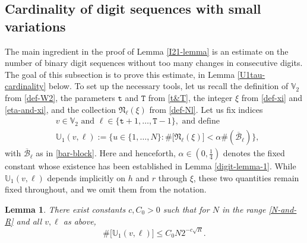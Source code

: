 \documentclass[12pt, twoside]{article}
\newtheorem{lemma}[theorem]{Lemma}
\theoremstyle{definition}
\numberwithin{equation}{section}
\begin{document}
\subsection{Cardinality of digit sequences with small variations}
The main ingredient in the proof of Lemma \ref{I21-lemma} is an estimate on the number of binary digit sequences without too many changes in consecutive digits. The goal of this subsection is to prove this estimate, in Lemma \ref{U1tau-cardinality} below. To set up the necessary tools, let us recall the definition of $\mathbb V_2$ from \eqref{def-W2}, the parameters $\mathtt t$ and $\mathtt T$ from \eqref{t&T}, the integer $\xi$ from \eqref{def-xi} and \eqref{eta-and-xi}, and the collection $\mathfrak N_{\ell}(\xi)$ from \eqref{def-Nl}. Let us fix indices 
\begin{align} \label{choice-of-tau}  
&v \in \mathbb V_2 \text{ and } \ell \in \{ \mathtt t + 1, \ldots, \mathtt T-1 \}, \text{ and define } \\  
\label{def-U1vtau}
&\mathbb U_1(v, \ell) := \bigl\{u \in \{1, \ldots, N\}: \#\bigl[ \mathfrak N_{\ell}(\xi) \bigr] < \alpha \#(\overline{\mathcal B}_{\ell}) \bigr\}, 
\end{align} 
with $\overline{\mathcal B}_{\ell}$ as in \eqref{bar-block}. Here and henceforth, $\alpha \in (0, \frac{1}{4})$ denotes the fixed constant whose existence has been established in Lemma \ref{digit-lemma-1}. While $\mathbb U_1(v, \ell)$ depends implicitly on $h$ and $r$ through $\xi$, these two quantities remain fixed throughout, and we omit them from the notation. 
\begin{lemma} \label{U1vtau-cardinality-lemma}
There exist constants $c, C_0 > 0$ such that for $N$ in the range \eqref{N-and-R} and all $v, \ell$ as above,  
\begin{equation} \label{U1tau-cardinality}
\# \bigl[ \mathbb U_1(v, \ell) \bigr] \leq  C_0 N 2^{-c \sqrt{R}}. 
\end{equation} 
\end{lemma} 
\end{document}
